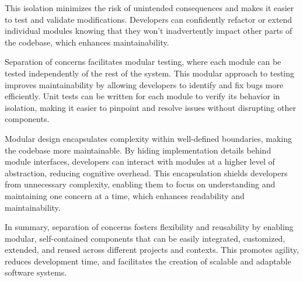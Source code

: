 This isolation minimizes the risk of unintended consequences and makes it easier to test and validate modifications.
Developers can confidently refactor or extend individual modules knowing that they won't inadvertently impact other parts of the codebase, which enhances maintainability.
\par
Separation of concerns facilitates modular testing, where each module can be tested independently of the rest of the system.
This modular approach to testing improves maintainability by allowing developers to identify and fix bugs more efficiently.
Unit tests can be written for each module to verify its behavior in isolation, making it easier to pinpoint and resolve issues without disrupting other components.
\par
Modular design encapsulates complexity within well-defined boundaries, making the codebase more maintainable.
By hiding implementation details behind module interfaces, developers can interact with modules at a higher level of abstraction, reducing cognitive overhead.
This encapsulation shields developers from unnecessary complexity, enabling them to focus on understanding and maintaining one concern at a time, which enhances readability and maintainability.
\par
In summary, separation of concerns fosters flexibility and reusability by enabling modular, self-contained components that can be easily integrated, customized, extended, and reused across different projects and contexts.
This promotes agility, reduces development time, and facilitates the creation of scalable and adaptable software systems.


